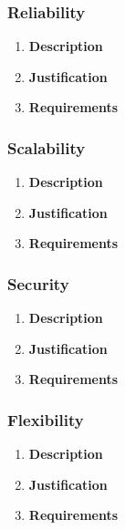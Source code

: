 \documentclass[a4paper,10pt]{article}
\begin{document}
\subsubsection{Reliability}
\begin{enumerate}
\item \textbf{Description} \\

\item \textbf{Justification} \\ 
\item \textbf{Requirements}
\end{enumerate}
\subsubsection{Scalability}
\begin{enumerate}
\item \textbf{Description} \\

\item \textbf{Justification} \\
\item \textbf{Requirements}
\end{enumerate}
\subsubsection{Security}
\begin{enumerate}
\item \textbf{Description} \\

\item \textbf{Justification} \\

\item \textbf{Requirements}

\end{enumerate}
\subsubsection{Flexibility}
\begin{enumerate}
\item \textbf{Description} \\
\item \textbf{Justification} \\

\item \textbf{Requirements}
\end{enumerate}
\end{document}
